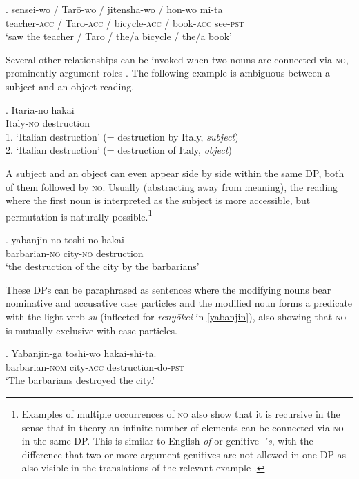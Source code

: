 \exg. sensei-wo / Tarō-wo / jitensha-wo / hon-wo mi-ta\\
teacher-\textsc{acc} / Taro-\textsc{acc} / bicycle-\textsc{acc} / book-\textsc{acc} see-\textsc{pst}\\
`saw the teacher / Taro / the/a bicycle / the/a book’ \label{noun reference}

Several other relationships can be invoked when two nouns are connected via \textsc{no}, prominently argument roles \citep{murasugi:1991:noun}. The following example is ambiguous between a subject and an object reading.

\exg. Itaria-no hakai\\
Italy-\textsc{no} destruction\\
1. `Italian destruction' \null \hfill (= destruction by Italy, \textit{subject})\\
2. `Italian destruction' \null \hfill (= destruction of Italy, \textit{object})

A subject and an object can even appear side by side within the same DP, both of them followed by \textsc{no}. Usually (abstracting away from meaning), the reading where the first noun is interpreted as the subject is more accessible, but permutation is naturally possible.\footnote{Examples of multiple occurrences of \textsc{no} also show that it is recursive in the sense that in theory an infinite number of elements can be connected via \textsc{no} in the same DP. This is similar to English \textit{of} or genitive -'\textit{s}, with the difference that two or more argument genitives are not allowed in one DP as also visible in the translations of the relevant example \citep[86]{murasugi:1991:noun}.}

\exg. yabanjin-no toshi-no hakai\\
barbarian-\textsc{no} city-\textsc{no} destruction\\
`the destruction of the city by the barbarians’ \hfill \citep[7]{murasugi:1991:noun}

These DPs can be paraphrased as sentences where the modifying nouns bear nominative and accusative case particles and the modified noun forms a predicate with the light verb \textit{su} (inflected for \textit{renyōkei} in \ref{yabanjin}), also showing that \textsc{no} is mutually exclusive with case particles.

\exg. Yabanjin-ga toshi-wo hakai-shi-ta.\\
barbarian-\textsc{nom} city-\textsc{acc} destruction-do-\textsc{pst}\\
`The barbarians destroyed the city.’ \label{yabanjin}

